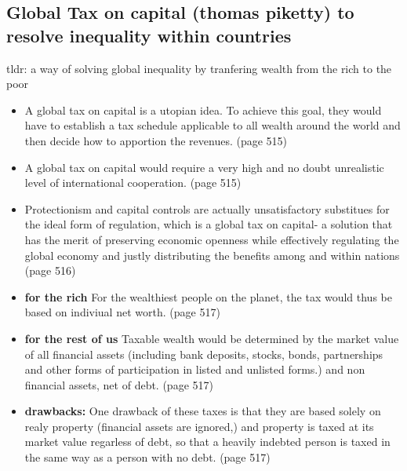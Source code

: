 \documentclass[11pt]{article}
\begin{document}
\subsection{Global Tax on capital (thomas piketty) to resolve inequality within countries}
tldr: a way of solving global inequality by tranfering wealth from the rich to the poor
\begin{itemize}
 \item A global tax on capital is a utopian idea. To achieve this goal, they would have to establish a tax schedule applicable to all wealth around the world and then decide how to apportion the revenues. (page 515)
       
 \item A global tax on capital would require a very high and no doubt unrealistic level of international cooperation. (page 515)
 \item Protectionism and capital controls are actually unsatisfactory substitues for the ideal form of regulation, which is a global tax on capital- a solution that has the merit of preserving economic openness while effectively regulating the global economy and justly distributing the benefits among and within nations (page 516)
 \item \textbf{for the rich} For the wealthiest people on the planet, the tax would thus be based on indiviual net worth. (page 517)
 \item \textbf{for the rest of us} Taxable wealth would be determined by the market value of all financial assets (including bank deposits, stocks, bonds, partnerships and other forms of participation in listed and unlisted forms.) and non financial assets, net of debt. (page 517)
 \item \textbf{drawbacks:} One drawback of these taxes is that they are based solely on realy property (financial assets are ignored,) and property is taxed at its market value regarless of debt, so that a heavily indebted person is  taxed in the same way as a person with no debt. (page 517)
\end{itemize}
\end{document}

